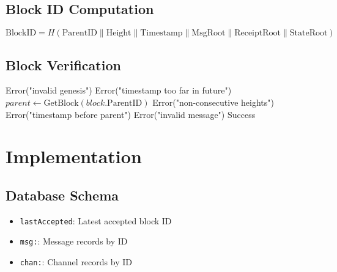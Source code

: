 \documentclass[11pt,twocolumn]{article}
\begin{document}
\subsection{Block ID Computation}

\begin{equation}
\text{BlockID} = H(\text{ParentID} \| \text{Height} \| \text{Timestamp} \| \text{MsgRoot} \| \text{ReceiptRoot} \| \text{StateRoot})
\end{equation}

\subsection{Block Verification}

\begin{algorithm}
\caption{Block Verification}
\label{alg:verify-block}
\begin{algorithmic}[1]
        \State \Return Error("invalid genesis")
    \EndIf
        \State \Return Error("timestamp too far in future")
    \EndIf
        \State $parent \gets \text{GetBlock}(block.\text{ParentID})$
            \State \Return Error("non-consecutive heights")
        \EndIf
            \State \Return Error("timestamp before parent")
        \EndIf
    \EndIf
            \State \Return Error("invalid message")
        \EndIf
    \EndFor
    \State \Return Success
\EndProcedure
\end{algorithmic}
\end{algorithm}

\section{Implementation}

\subsection{Database Schema}

\begin{itemize}
\item \texttt{lastAccepted}: Latest accepted block ID
\item \texttt{msg:}: Message records by ID
\item \texttt{chan:}: Channel records by ID
\end{itemize}
\end{document}
